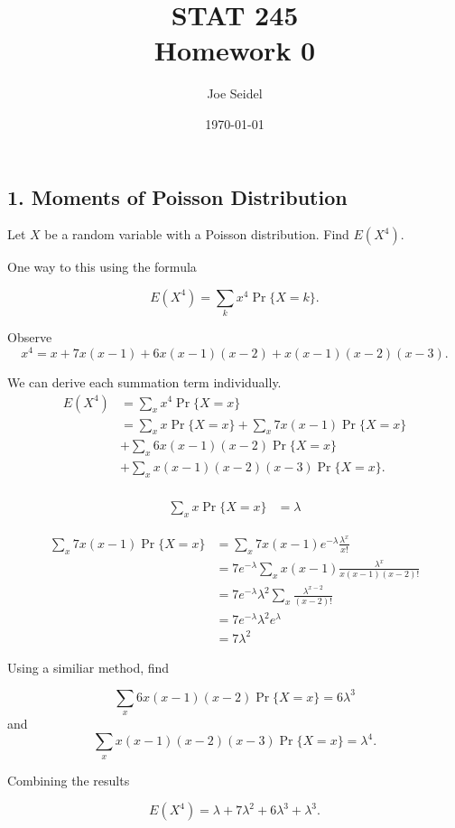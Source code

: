\documentclass{tufte-book}
\title{STAT  245\\Homework 0}
\author{Joe Seidel}
\date{\today}
\begin{document}
\maketitle
{}
\newpage
{}

\subsection{1. Moments of Poisson Distribution}
Let $X$ be a random variable with a Poisson distribution.  Find $E(X^4)$.

One way to this using the formula

\[ E(X^4) = \sum_k x^4 \Pr\{X=k\}. \]

Observe 
\[ x^4 = x+ 7x(x-1) + 6x(x-1)(x-2) + x(x-1)(x-2)(x-3). \]

We can derive each summation term individually.
\begin{align*}
E(X^4) &= \sum_x x^4 \Pr\{X=x\}\\
&= \sum_x x\Pr\{X=x\} + \sum_x 7x(x-1)\Pr\{X=x\} \\
&+ \sum_x 6x(x-1)(x-2)\Pr\{X=x\}\\
&+ \sum_x x(x-1)(x-2)(x-3) \Pr\{X=x\} .  \\
\end{align*}

\begin{align*}
\sum_x x\Pr\{X=x\} &= \lambda
\end{align*}

\begin{align*}
\sum_x 7x(x-1)\Pr\{X=x\} &= \sum_x 7x(x-1) e^{-\lambda}\frac{\lambda^x}{x!}\\
&=7e^{-\lambda} \sum_x x(x-1) \frac{\lambda^x}{x(x-1)(x-2)!}\\
&=7e^{-\lambda} \lambda^2 \sum_x \frac{\lambda^{x-2}}{(x-2)!}\\
&=7e^{-\lambda} \lambda^2 e^{\lambda}\\
&=7\lambda^2
\end{align*}

Using a similiar method, find


\[ \sum_x 6x(x-1)(x-2)\Pr\{X=x\} = 6\lambda^3 \]
and
\[ \sum_x x(x-1)(x-2)(x-3) \Pr\{X=x\} = \lambda^4. \]

Combining the results

\[ E(X^4) = \lambda + 7\lambda^2 + 6\lambda^3 + \lambda^3. \]
\end{document}
